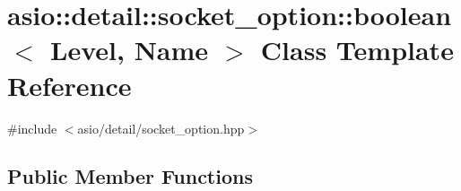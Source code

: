 \hypertarget{classasio_1_1detail_1_1socket__option_1_1boolean}{}\section{asio\+:\+:detail\+:\+:socket\+\_\+option\+:\+:boolean$<$ Level, Name $>$ Class Template Reference}
\label{classasio_1_1detail_1_1socket__option_1_1boolean}


{\ttfamily \#include $<$asio/detail/socket\+\_\+option.\+hpp$>$}

\subsection*{Public Member Functions}

